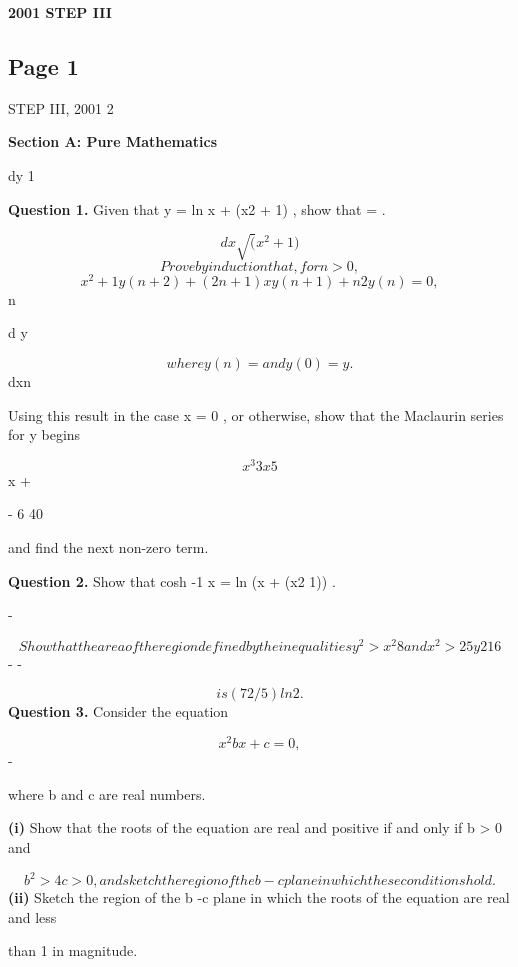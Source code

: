 \documentclass[12pt]{article}
\begin{document}
\begin{center}
{\Large \textbf{2001 STEP III}}
\end{center}

\subsection*{Page 1}
\begin{flushleft}
STEP III, 2001 2\par
\bigskip\textbf{Section A: Pure Mathematics}\par
dy 1\par
\bigskip\textbf{Question 1.} Given that y = ln x + \sqrt(x2 + 1) , show that = .\par
\[dx \sqrt(x^2 + 1)\]
\[Prove by induction that, for n > 0 ,\]
\[x^2 + 1 y(n+2) + (2n + 1) xy(n+1) + n2y(n) = 0 ,\]
n\par
d y\par
\[where y(n) = and y(0) = y .\]
dxn\par
Using this result in the case x = 0 , or otherwise, show that the Maclaurin series for y begins\par
\[x^3 3x5\]
x +\par
- 6 40\par
and find the next non-zero term.\par
\bigskip\textbf{Question 2.} Show that cosh -1 x = ln (x + \sqrt(x2 1)) .\par
-\par
\[Show that the area of the region defined by the inequalities y^2 > x^2 8 and x^2 > 25y2 16\]
- -\par
\[is (72/5) ln 2.\]
\bigskip\textbf{Question 3.} Consider the equation\par
\[x^2 bx + c = 0 ,\]
-\par
where b and c are real numbers.\par
\textbf{(i)} Show that the roots of the equation are real and positive if and only if b > 0 and\par
\[b^2 > 4c > 0, and sketch the region of the b -c plane in which these conditions hold.\]
\textbf{(ii)} Sketch the region of the b -c plane in which the roots of the equation are real and less\par
than 1 in magnitude.\par
\end{flushleft}
\end{document}
